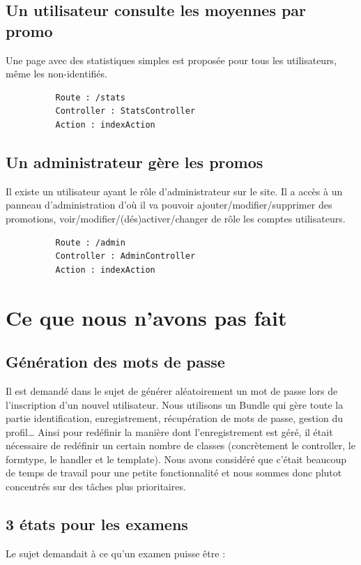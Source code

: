 \documentclass{report}
\begin{document}
      \subsection{Un utilisateur consulte les moyennes par promo}
        Une page avec des statistiques simples est proposée pour tous les utilisateurs,
        même les non-identifiés.
        \begin{verbatim}
          Route : /stats
          Controller : StatsController
          Action : indexAction
        \end{verbatim}

      \subsection{Un administrateur gère les promos}
        Il existe un utilisateur ayant le rôle d'administrateur sur le site. Il
        a accès à un panneau d'administration d'où il va pouvoir 
        ajouter/modifier/supprimer des promotions, voir/modifier/(dés)activer/changer de rôle
        les comptes utilisateurs.
        \begin{verbatim}
          Route : /admin
          Controller : AdminController
          Action : indexAction
        \end{verbatim}
 
    \section{Ce que nous n'avons pas fait}
    \subsection{Génération des mots de passe}
        Il est demandé dans le sujet de générer aléatoirement un mot de passe lors 
        de l'inscription d'un nouvel utilisateur. Nous utilisons un Bundle qui 
        gère toute la partie identification, enregistrement, récupération de mots
        de passe, gestion du profil… Ainsi pour redéfinir la manière dont l'enregistrement
        est géré, il était nécessaire de redéfinir un certain nombre de classes
        (concrètement le controller, le formtype, le handler et le template). Nous
        avons considéré que c'était beaucoup de temps de travail pour une petite fonctionnalité
        et nous sommes donc plutot concentrés sur des tâches plus prioritaires.
        
        
      \subsection{3 états pour les examens}
        Le sujet demandait à ce qu'un examen puisse être :
\end{document}
